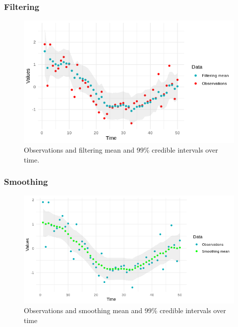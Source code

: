 \documentclass[xcolor=dvipsnames, compress]{beamer}
\begin{document}
\begin{frame}
\frametitle{Filtering}
\begin{figure}
	\includegraphics[scale=0.7]{Rplot02.png}
	\caption{Observations and filtering mean and 99\% credible intervals over time.}
\end{figure}
\end{frame}

\begin{frame}
\frametitle{Smoothing}
\begin{figure}
	\includegraphics[scale=0.65]{Rplot03.png}
	\caption{Observations and smoothing mean and 99\% credible intervals over time}
\end{figure}
\end{frame}
\end{document}
